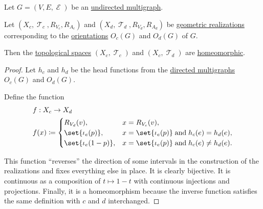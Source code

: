 \begin{proposition}\label{thm:undirected_multigraph_geometric_realizations_homeomorphic}
  Let \( G = (V, E, \mscrE) \) be an \hyperref[def:hypergraph/multigraph]{undirected multigraph}.

  Let \( (X_c, \mscrT_c, R_{V_c}, R_{A_c}) \) and \( (X_d, \mscrT_d, R_{V_d}, R_{A_d}) \) be \hyperref[def:graph_geometric_realization/undirected]{geometric realizations} corresponding to the \hyperref[def:multigraph_orientation]{orientations} \( O_c(G) \) and \( O_d(G) \) of \( G \).

  Then the \hyperref[def:topological_space]{topological spaces} \( (X_c, \mscrT_c) \) and \( (X_c, \mscrT_d) \) are \hyperref[def:homeomorphism]{homeomorphic}.
\end{proposition}
\begin{proof}
  Let \( h_c \) and \( h_d \) be the head functions from the \hyperref[def:directed_multigraph]{directed multigraphs} \( O_c(G) \) and \( O_d(G) \).

  Define the function
  \begin{equation*}
    \begin{aligned}
      &f: X_c \to X_d \\
      &f(x) \coloneqq \begin{cases}
        R_{V_d}(v),             &x = R_{V_c}(v), \\
        \set{ \iota_e(p) },     &x = \set{ \iota_e(p) } \T{and} h_c(e) = h_d(e), \\
        \set{ \iota_e(1 - p) }, &x = \set{ \iota_e(p) } \T{and} h_c(e) \neq h_d(e).
      \end{cases}
    \end{aligned}
  \end{equation*}

  This function \enquote{reverses} the direction of some intervals in the construction of the realizations and fixes everything else in place. It is clearly bijective. It is continuous as a composition of \( t \mapsto 1 - t \) with continuous injections and projections. Finally, it is a homeomorphism because the inverse function satisfies the same definition with \( c \) and \( d \) interchanged.
\end{proof}

